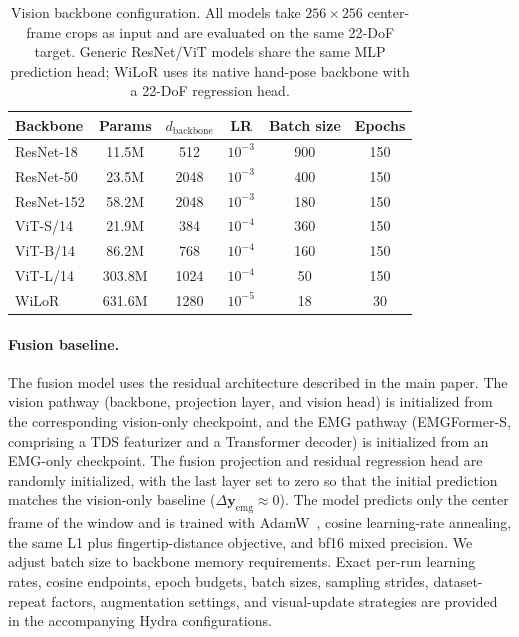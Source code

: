 \documentclass[letterpaper]{article} %
\newcommand{\model}{EMGFormer}
\begin{document}
\begin{table}[t]
\centering
\caption{Vision backbone configuration. All models take $256\times256$ center-frame crops as input and are evaluated on the same 22-DoF target. Generic ResNet/ViT models share the same MLP prediction head; WiLoR uses its native hand-pose backbone with a 22-DoF regression head.}
\label{tab:vision_config}
\footnotesize
\setlength{\tabcolsep}{3.0pt}
\renewcommand{\arraystretch}{1.05}
\begin{tabular}{lccccc}
\toprule
Backbone & Params & $d_{\text{backbone}}$ & LR & Batch size & Epochs \\
\midrule
ResNet-18  & 11.5M  & 512  & $10^{-3}$ & 900 & 150 \\
ResNet-50  & 23.5M  & 2048 & $10^{-3}$ & 400 & 150 \\
ResNet-152 & 58.2M  & 2048 & $10^{-3}$ & 180 & 150 \\
ViT-S/14   & 21.9M  & 384  & $10^{-4}$ & 360 & 150 \\
ViT-B/14   & 86.2M  & 768  & $10^{-4}$ & 160 & 150 \\
ViT-L/14   & 303.8M & 1024 & $10^{-4}$ & 50  & 150 \\
WiLoR      & 631.6M & 1280   & $10^{-5}$ & 18  & 30 \\
\bottomrule
\end{tabular}

\end{table}

\paragraph{Fusion baseline.}
The fusion model uses the residual architecture described in the main paper. The vision pathway (backbone, projection layer, and vision head) is initialized from the corresponding vision-only checkpoint, and the EMG pathway (\model{}-S, comprising a TDS featurizer and a Transformer decoder) is initialized from an EMG-only checkpoint. The fusion projection and residual regression head are randomly initialized, with the last layer set to zero so that the initial prediction matches the vision-only baseline ($\Delta\mathbf{y}_{\text{emg}} \approx 0$). The model predicts only the center frame of the window and is trained with AdamW~\citep{adamw}, cosine learning-rate annealing, the same L1 plus fingertip-distance objective, and bf16 mixed precision. We adjust batch size to backbone memory requirements. Exact per-run learning rates, cosine endpoints, epoch budgets, batch sizes, sampling strides, dataset-repeat factors, augmentation settings, and visual-update strategies are provided in the accompanying Hydra configurations.
\end{document}
